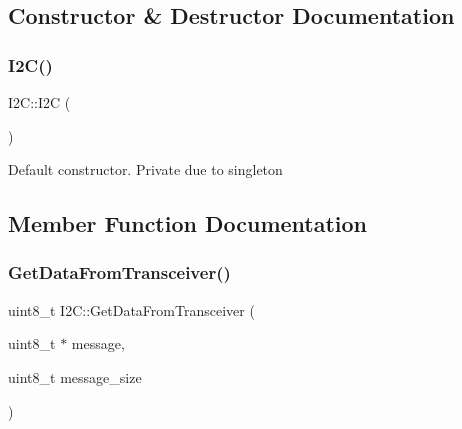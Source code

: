 \subsection{Constructor \& Destructor Documentation}
\hypertarget{class_i2_c_a7a9a84fccdacb3346ff97d6f3e158850}{}\label{class_i2_c_a7a9a84fccdacb3346ff97d6f3e158850} 
\subsubsection{\texorpdfstring{I2\+C()}{I2C()}}
{\footnotesize\ttfamily I2\+C\+::\+I2C (\begin{DoxyParamCaption}{ }\end{DoxyParamCaption})\hspace{0.3cm}{\ttfamily [private]}}

Default constructor. Private due to singleton 

\subsection{Member Function Documentation}
\hypertarget{class_i2_c_a2023e5108a9bfb4ac09f509f74137307}{}\label{class_i2_c_a2023e5108a9bfb4ac09f509f74137307} 
\subsubsection{\texorpdfstring{Get\+Data\+From\+Transceiver()}{GetDataFromTransceiver()}}
{\footnotesize\ttfamily uint8\+\_\+t I2\+C\+::\+Get\+Data\+From\+Transceiver (\begin{DoxyParamCaption}\item[{uint8\+\_\+t $\ast$}]{message,  }\item[{uint8\+\_\+t}]{message\+\_\+size }\end{DoxyParamCaption})}

